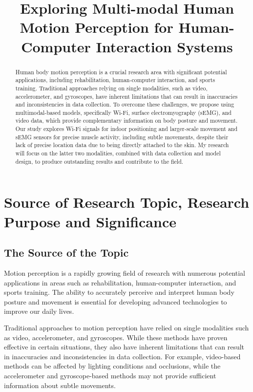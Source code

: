 \documentclass[12pt, a4paper]{article}
\title{\fontsize{14pt}{6pt}\selectfont\textbf{Exploring Multi-modal Human Motion Perception for Human-Computer Interaction Systems}} %
\date{} %
\author{}
\begin{document}


\maketitle
\begin{abstract}
    Human body motion perception is a crucial research area with significant potential applications, including rehabilitation, human-computer interaction, and sports training. Traditional approaches relying on single modalities, such as video, accelerometer, and gyroscopes, have inherent limitations that can result in inaccuracies and inconsistencies in data collection. To overcome these challenges, we propose using multimodal-based models, specifically Wi-Fi, surface electromyography (sEMG), and video data, which provide complementary information on body posture and movement. Our study explores Wi-Fi signals for indoor positioning and larger-scale movement and sEMG sensors for precise muscle activity, including subtle movements, despite their lack of precise location data due to being directly attached to the skin. My research will focus on the latter two modalities, combined with data collection and model design, to produce outstanding results and contribute to the field.
\end{abstract}
\newpage
\tableofcontents
\newpage
\section{Source of Research Topic, Research Purpose and Significance}

\subsection{The Source of the Topic}
Motion perception is a rapidly growing field of research with numerous potential applications in areas such as rehabilitation, human-computer interaction, and sports training. The ability to accurately perceive and interpret human body posture and movement is essential for developing advanced technologies to improve our daily lives.

Traditional approaches to motion perception have relied on single modalities such as video, accelerometer, and gyroscopes. While these methods have proven effective in certain situations, they also have inherent limitations that can result in inaccuracies and inconsistencies in data collection. For example, video-based methods can be affected by lighting conditions and occlusions, while the accelerometer and gyroscope-based methods may not provide sufficient information about subtle movements.
\end{document}
